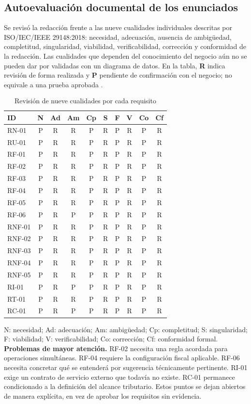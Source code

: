 \subsection{Autoevaluación documental de los enunciados}
Se revisó la redacción frente a las nueve cualidades individuales descritas por ISO/IEC/IEEE 29148:2018: necesidad, adecuación, ausencia de ambigüedad, completitud, singularidad, viabilidad, verificabilidad, corrección y conformidad de la redacción. Las cualidades que dependen del conocimiento del negocio aún no se pueden dar por validadas con un diagrama de datos. En la tabla, \textbf{R} indica revisión de forma realizada y \textbf{P} pendiente de confirmación con el negocio; no equivale a una prueba aprobada \cite{iso29148}.
\begin{table}[!ht]
\centering\tiny
\caption{Revisión de nueve cualidades por cada requisito}
\label{tab:nueve}
\begin{tabular}{@{}lccccccccc@{}}
\toprule ID & N & Ad & Am & Cp & S & F & V & Co & Cf\\\midrule
RN-01 & P & R & R & P & R & P & R & P & R\\
RU-01 & P & R & R & P & R & P & R & P & R\\
RF-01 & P & R & R & P & R & P & R & P & R\\
RF-02 & P & R & R & P & R & P & R & P & R\\
RF-03 & P & R & R & P & R & P & R & P & R\\
RF-04 & P & R & R & P & R & P & R & P & R\\
RF-05 & P & R & R & P & R & P & R & P & R\\
RF-06 & P & R & P & P & R & P & R & P & R\\
RNF-01 & P & R & R & P & R & P & R & P & R\\
RNF-02 & P & R & R & P & R & P & R & P & R\\
RNF-03 & P & R & R & P & R & P & R & P & R\\
RNF-04 & P & R & R & P & R & P & R & P & R\\
RNF-05 & P & R & R & P & R & P & R & P & R\\
RI-01 & P & R & P & P & R & P & R & P & R\\
RT-01 & P & R & R & P & R & P & R & P & R\\
RC-01 & P & R & P & P & R & P & R & P & R\\
\bottomrule
\end{tabular}
\end{table}
\noindent\footnotesize N: necesidad; Ad: adecuación; Am: ambigüedad; Cp: completitud; S: singularidad; F: viabilidad; V: verificabilidad; Co: corrección; Cf: conformidad formal.\\
\normalsize
\textbf{Problemas de mayor atención.} RF-02 necesita una regla acordada para operaciones simultáneas. RF-04 requiere la configuración fiscal aplicable. RF-06 necesita concretar qué se entenderá por sugerencia técnicamente pertinente. RI-01 exige un contrato de servicio externo que todavía no existe. RC-01 permanece condicionado a la definición del alcance tributario. Estos puntos se dejan abiertos de manera explícita, en vez de aprobar los requisitos sin evidencia.

